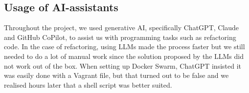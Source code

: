 \subsection{Usage of AI-assistants} %

Throughout the project, we used generative AI, specifically ChatGPT, Claude and GitHub CoPilot, to assist us with programming tasks such as refactoring code. In the case of refactoring, using LLMs made the process faster but we still needed to do a lot of manual work since the solution proposed by the LLMs did not work out of the box. When setting up Docker Swarm, ChatGPT insisted it was easily done with a Vagrant file, but that turned out to be false and we realised hours later that a shell script was better suited.

